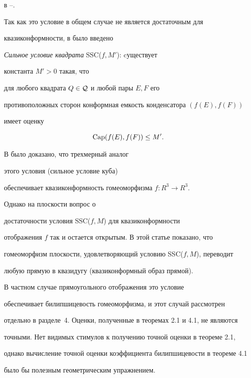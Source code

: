 в \cite{Caz1}--\cite{Zb1}.


 


Так как это условие в общем случае не является достаточным для 


квазиконформности, в \cite{Zb2} было введено 





{\it Сильное условие квадрата} SSC($f, M'$): cуществует 


константа $M' > 0$ такая, что 


для любого квадрата $Q\in {\cal Q}$ и любой пары $E,F$ его 


противоположных сторон конформная емкость конденсатора $(f(E),f(F))$ 


имеет оценку 


\begin{equation}


\Capp (f(E),f(F)) \leq M'.


\end{equation}





В \cite{As1} было доказано, что трехмерный аналог 


этого условия (сильное условие куба) 


обеспечивает квазиконформность гомеоморфизма $f: R^3 \to R^3$. 


Однако на плоскости вопрос о 


достаточности условия SSC($f,M$) для квазиконформности 


отображения $f$ так и остается открытым. В этой статье показано, что 


гомеоморфизм плоскости, удовлетворяющий условию SSC($f,M$), переводит 


любую прямую в квазидугу (квазиконформный образ прямой). 


В частном случае прямоугольного отображения это условие 


обеспечивает билипшицевость гомеоморфизма, и этот случай рассмотрен 


отдельно в разделе~4. Оценки, полученные в теоремах 2.1 и 4.1, не являются 


точными. Нет видимых стимулов к получению точной оценки в теореме 2.1, 


однако вычисление точной оценки коэффициента билипшицевости в теореме 4.1 


было бы полезным геометрическим упражнением. 





